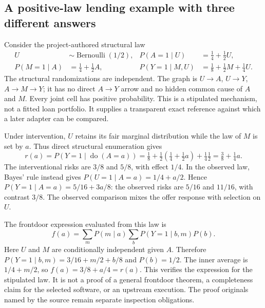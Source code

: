 \subsection{A positive-law lending example with three different answers}
\label{exec19:otherid-law}
Consider the project-authored structural law
\begin{align}
 U&\sim\operatorname{Bernoulli}(1/2), &
 P(A=1\mid U)&=\tfrac14+\tfrac12U,\nonumber\\
 P(M=1\mid A)&=\tfrac14+\tfrac12A, &
 P(Y=1\mid M,U)&=\tfrac18+\tfrac12M+\tfrac14U.
 \label{exec19:otherid-structural}
\end{align}
The structural randomizations are independent. The graph is
$U\to A$, $U\to Y$, $A\to M\to Y$; it has no direct $A\to Y$ arrow
and no hidden common cause of $A$ and $M$. Every joint cell has positive
probability. This is a stipulated mechanism, not a fitted loan portfolio.
It supplies a transparent exact reference against which a later adapter can
be compared.~\citep{exec19_otherid_reference}

Under intervention, $U$ retains its fair marginal distribution while the law
of $M$ is set by $a$. Thus direct structural enumeration gives
\begin{equation}
 r(a)=P(Y=1\mid\operatorname{do}(A=a))
 =\tfrac18+\tfrac12(\tfrac14+\tfrac12a)+\tfrac14\tfrac12
 =\tfrac38+\tfrac14a.
 \label{exec19:otherid-risks}
\end{equation}
The interventional risks are $3/8$ and $5/8$, with effect $1/4$. In the
observed law, Bayes' rule instead gives $P(U=1\mid A=a)=1/4+a/2$. Hence
$P(Y=1\mid A=a)=5/16+3a/8$: the observed risks are $5/16$ and $11/16$,
with contrast $3/8$. The observed comparison mixes the offer response with
selection on $U$.~\citep{exec19_otherid_reference}

The frontdoor expression evaluated from this law is
\begin{equation}
 f(a)=\sum_m P(m\mid a)\sum_b P(Y=1\mid b,m)P(b).
 \label{exec19:otherid-frontdoor}
\end{equation}
Here $U$ and $M$ are conditionally independent given $A$. Therefore
$P(Y=1\mid b,m)=3/16+m/2+b/8$ and $P(b)=1/2$. The inner average is
$1/4+m/2$, so $f(a)=3/8+a/4=r(a)$. This verifies the expression for
the stipulated law. It is not a proof of a general frontdoor theorem, a
completeness claim for the selected software, or an upstream execution. The
proof originals named by the source remain separate inspection obligations.
\citep{exec19_otherid_reference,exec19_otherid_julia}

